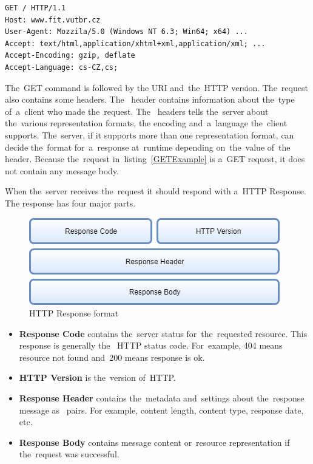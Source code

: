 \vspace{2mm}
\begin{lstlisting}[caption=A~sample of~a~simplified GET Request.,
label=GETExample, language=HTML] 
GET / HTTP/1.1
Host: www.fit.vutbr.cz
User-Agent: Mozzila/5.0 (Windows NT 6.3; Win64; x64) ...
Accept: text/html,application/xhtml+xml,application/xml; ...
Accept-Encoding: gzip, deflate
Accept-Language: cs-CZ,cs;
\end{lstlisting}

The~GET command is followed by the URI
and~the~HTTP version. The~request also contains some headers.
The~ header contains information about the~type of~a~client who
made the~request. The~ headers tells the~server about the~various
representation formats, the encoding and~a~language the~client supports.
The~server, if it supports more than one representation format, can decide
the~format for~a~response at~runtime depending on~the~value
of~the~ header. Because the~request in~listing~\ref{GETExample} is
a~GET request, it does not contain any message body.

When the~server receives the~request it should respond with a~HTTP Response.
The response has four major parts.

\begin{figure}[!hbt]
	\centering
	\includegraphics[scale=0.65]{./obrazky-figures/html-response.png}
	\caption{HTTP Response format}
	\label{HTTPResponseFormat}
\end{figure}

\begin{itemize}
  \item \textbf{Response Code} contains the~server status for~the~requested
  resource. This response is generally the~ HTTP status code.
  For~example, 404 means resource not found and~200 means
  response is ok.
  \item \textbf{HTTP Version} is the~version of~HTTP.
  \item \textbf{Response Header} contains the~metadata and~settings about
  the~response message as~ pairs. For example, content length,
  content type, response date, etc.
  \item \textbf{Response Body} contains message content or~resource
  representation if the~request was successful.
\end{itemize}


